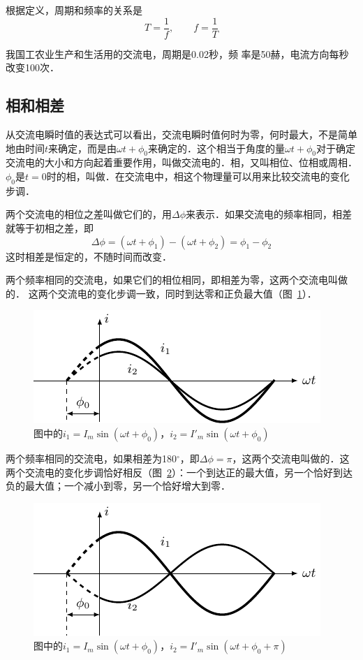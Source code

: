 根据定义，周期和频率的关系是
\[T=\frac{1}{f},\qquad f=\frac{1}{T}\]
	
我国工农业生产和生活用的交流电，周期是0.02秒，频
率是50赫，电流方向每秒改变100次．

\subsection{相和相差}

从交流电瞬时值的表达式可以看出，交流电瞬时值何时为零，何时最大，不是简单地由时间$t$来确定，而是由$\omega t+\phi_0$来确定的．这个相当于角度的量$\omega t+\phi_0$对于确定交流电的大小和方向起着重要作用，叫做交流电的．相，又叫相位、位相或周相．
$\phi_0$是$t=0$时的相，叫做．在交流电中，相这个物理量可以用来比较交流电的变化步调．

两个交流电的相位之差叫做它们的，用$\Delta \phi$来表示．如果交流电的频率相同，相差就等于初相之差，即
\[\Delta \phi=(\omega t+\phi_1)-(\omega t+\phi_2)=\phi_1-\phi_2 \]
这时相差是恒定的，不随时间而改变．

两个频率相同的交流电，如果它们的相位相同，即相差为零，这两个交流电叫做的．
这两个交流电的变化步调一致，同时到达零和正负最大值（图~\ref{fig_C_3-6}）．
\begin{figure}[htbp]
    \centering
    \includegraphics{fig/C/3-6.pdf}
    \caption{图中的$i_1=I_m\sin(\omega t+\phi_0)$，$i_2=I'_m\sin(\omega t+\phi_0)$}\label{fig_C_3-6}
\end{figure}

两个频率相同的交流电，如果相差为180$^\circ$，即$\Delta\phi=\pi$，这两个交流电叫做的．这两个交流电的变化步调恰好相反（图~\ref{fig_C_3-7}）：一个到达正的最大值，另一个恰好到达负的最大值；一个减小到零，另一个恰好增大到零．
\begin{figure}[htbp]
    \centering
    \includegraphics{fig/C/3-7.pdf}
    \caption{图中的$i_1=I_m\sin(\omega t+\phi_0)$，$i_2=I'_m\sin(\omega t+\phi_0+\pi)$}\label{fig_C_3-7}
\end{figure}

